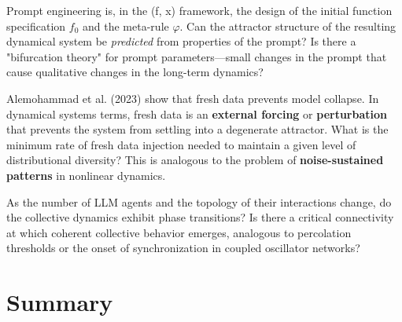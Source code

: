 \begin{question}
Prompt engineering is, in the (f, x) framework, the design of the initial function specification $f_0$ and the meta-rule $\varphi$. Can the attractor structure of the resulting dynamical system be \textit{predicted} from properties of the prompt? Is there a "bifurcation theory" for prompt parameters---small changes in the prompt that cause qualitative changes in the long-term dynamics?
\end{question}

\begin{question}
Alemohammad et al. (2023) show that fresh data prevents model collapse. In dynamical systems terms, fresh data is an \textbf{external forcing} or \textbf{perturbation} that prevents the system from settling into a degenerate attractor. What is the minimum rate of fresh data injection needed to maintain a given level of distributional diversity? This is analogous to the problem of \textbf{noise-sustained patterns} in nonlinear dynamics.
\end{question}

\begin{question}
As the number of LLM agents and the topology of their interactions change, do the collective dynamics exhibit phase transitions? Is there a critical connectivity at which coherent collective behavior emerges, analogous to percolation thresholds or the onset of synchronization in coupled oscillator networks?
\end{question}



\section{Summary}

